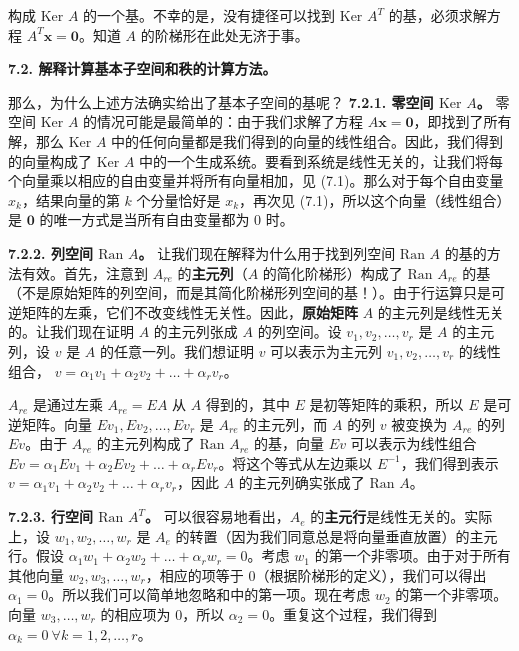 构成 $\text{Ker } A$ 的一个基。不幸的是，没有捷径可以找到 $\text{Ker } A^T$ 的基，必须求解方程 $A^T \mathbf{x} = \mathbf{0}$。知道 $A$ 的阶梯形在此处无济于事。

\textbf{7.2. 解释计算基本子空间和秩的计算方法。}

那么，为什么上述方法确实给出了基本子空间的基呢？
\textbf{7.2.1. 零空间 $\text{Ker } A$。}
零空间 $\text{Ker } A$ 的情况可能是最简单的：由于我们求解了方程 $A \mathbf{x} = \mathbf{0}$，即找到了所有解，那么 $\text{Ker } A$ 中的任何向量都是我们得到的向量的线性组合。因此，我们得到的向量构成了 $\text{Ker } A$ 中的一个生成系统。要看到系统是线性无关的，让我们将每个向量乘以相应的自由变量并将所有向量相加，见 (7.1)。那么对于每个自由变量 $x_k$，结果向量的第 $k$ 个分量恰好是 $x_k$，再次见 (7.1)，所以这个向量（线性组合）是 $\mathbf{0}$ 的唯一方式是当所有自由变量都为 0 时。

\textbf{7.2.2. 列空间 $\text{Ran } A$。}
让我们现在解释为什么用于找到列空间 $\text{Ran } A$ 的基的方法有效。首先，注意到 $A_{re}$ 的\textbf{主元列}（$A$ 的简化阶梯形）构成了 $\text{Ran } A_{re}$ 的基（不是原始矩阵的列空间，而是其简化阶梯形列空间的基！）。由于行运算只是可逆矩阵的左乘，它们不改变线性无关性。因此，\textbf{原始矩阵} $A$ 的主元列是线性无关的。让我们现在证明 $A$ 的主元列张成 $A$ 的列空间。设 $v_1, v_2, \dots, v_r$ 是 $A$ 的主元列，设 $v$ 是 $A$ 的任意一列。我们想证明 $v$ 可以表示为主元列 $v_1, v_2, \dots, v_r$ 的线性组合， $v = \alpha_1 v_1 + \alpha_2 v_2 + \dots + \alpha_r v_r$。

$A_{re}$ 是通过左乘 $A_{re} = EA$ 从 $A$ 得到的，其中 $E$ 是初等矩阵的乘积，所以 $E$ 是可逆矩阵。向量 $E v_1, E v_2, \dots, E v_r$ 是 $A_{re}$ 的主元列，而 $A$ 的列 $v$ 被变换为 $A_{re}$ 的列 $E v$。由于 $A_{re}$ 的主元列构成了 $\text{Ran } A_{re}$ 的基，向量 $E v$ 可以表示为线性组合 $E v = \alpha_1 E v_1 + \alpha_2 E v_2 + \dots + \alpha_r E v_r$。将这个等式从左边乘以 $E^{-1}$，我们得到表示 $v = \alpha_1 v_1 + \alpha_2 v_2 + \dots + \alpha_r v_r$，因此 $A$ 的主元列确实张成了 $\text{Ran } A$。

\textbf{7.2.3. 行空间 $\text{Ran } A^T$。}
可以很容易地看出，$A_e$ 的\textbf{主元行}是线性无关的。实际上，设 $w_1, w_2, \dots, w_r$ 是 $A_e$ 的转置（因为我们同意总是将向量垂直放置）的主元行。假设 $\alpha_1 w_1 + \alpha_2 w_2 + \dots + \alpha_r w_r = 0$。考虑 $w_1$ 的第一个非零项。由于对于所有其他向量 $w_2, w_3, \dots, w_r$，相应的项等于 0（根据阶梯形的定义），我们可以得出 $\alpha_1 = 0$。所以我们可以简单地忽略和中的第一项。现在考虑 $w_2$ 的第一个非零项。向量 $w_3, \dots, w_r$ 的相应项为 0，所以 $\alpha_2 = 0$。重复这个过程，我们得到 $\alpha_k = 0 \ \forall k = 1, 2, \dots, r$。


